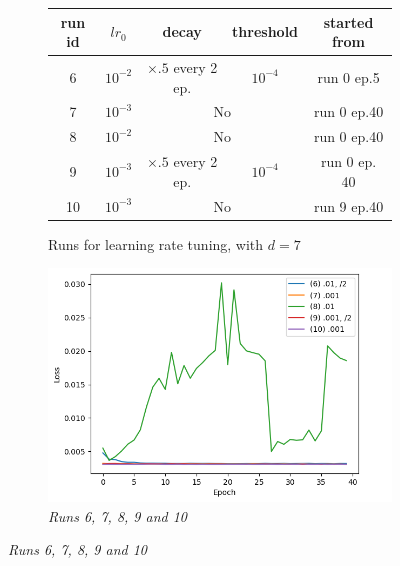 \documentclass{article}
\begin{document}
            \begin{figure}[!ht]
                \begin{subfigure}{.6\linewidth}
                    \begin{tabular}{|c|c|c|c|c|}
                        \hline
                        run id & $lr_0$ & decay & threshold & started from\\
                        \hline
                        \hline
                        6 & $10^{-2}$ & $\times .5$ every 2 ep. & $10^{-4}$ & run 0 ep.5 \\
                        \hline
                        7 & $10^{-3}$ & \multicolumn{2}{|c|}{No} & run 0 ep.40 \\
                        \hline
                        8 & $10^{-2}$ & \multicolumn{2}{|c|}{No} & run 0 ep.40 \\
                        \hline
                        9 & $10^{-3}$ & $\times .5$ every 2 ep. & $10^{-4}$ & run 0 ep. 40 \\
                        \hline
                        10 & $10^{-3}$ & \multicolumn{2}{|c|}{No} & run 9 ep.40\\
                        \hline
                    \end{tabular}
                    \caption{Runs for learning rate tuning, with $d=7$}
                \end{subfigure}
                \begin{subfigure}{.39\linewidth}
                    \centering
                    \includegraphics[width=\linewidth]{pics/hpp-lr-loss-678910.png}
                    \caption{\textit{Runs 6, 7, 8, 9 and 10}}
                    \label{fig:hpp-lr-div}

\end{subfigure}
\end{figure}
\end{document}
